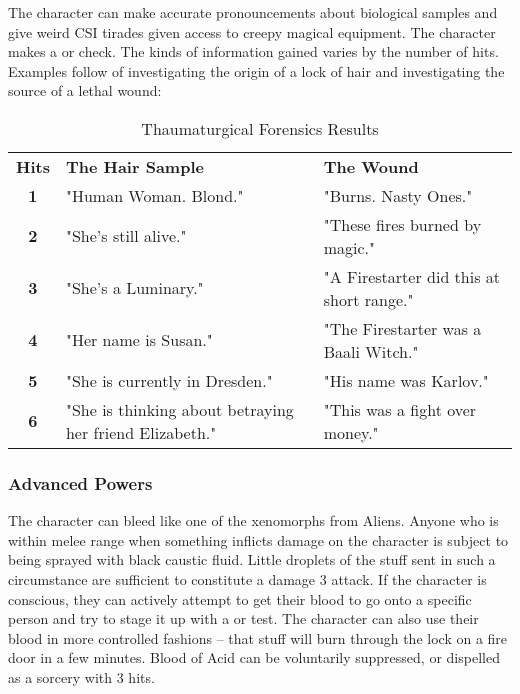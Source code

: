  The character can make accurate pronouncements about biological samples and give weird CSI tirades given access to creepy magical equipment. The character makes a  or  check. The kinds of information gained varies by the number of hits. Examples follow of investigating the origin of a lock of hair and investigating the source of a lethal wound:


\begin{table}[htb]
 \caption{Thaumaturgical Forensics Results} \centering
\begin{tabular}{c l l}
\textbf{Hits} & \textbf{The Hair Sample} & \textbf{The Wound}\\
\textbf{1}& "Human Woman. Blond." & "Burns. Nasty Ones."\\
\textbf{2}& "She's still alive." & "These fires burned by magic."\\
\textbf{3}&"She's a Luminary." & "A Firestarter did this at short range."\\
\textbf{4}& "Her name is Susan." & "The Firestarter was a Baali Witch."\\
\textbf{5}& "She is currently in Dresden." & "His name was Karlov."\\
\textbf{6}& "She is thinking about betraying her friend Elizabeth." & "This was a fight over money."\\
\end{tabular}
\end{table}


\subsubsection{Advanced Powers}

The character can bleed like one of the xenomorphs from Aliens. Anyone who is within melee range when something inflicts damage on the character is subject to being sprayed with black caustic fluid. Little droplets of the stuff sent in such a circumstance are sufficient to constitute a damage 3 attack. If the character is conscious, they can actively attempt to get their blood to go onto a specific person and try to stage it up with a  or  test. The character can also use their blood in more controlled fashions -- that stuff will burn through the lock on a fire door in a few minutes. Blood of Acid can be voluntarily suppressed, or dispelled as a sorcery with 3 hits.

